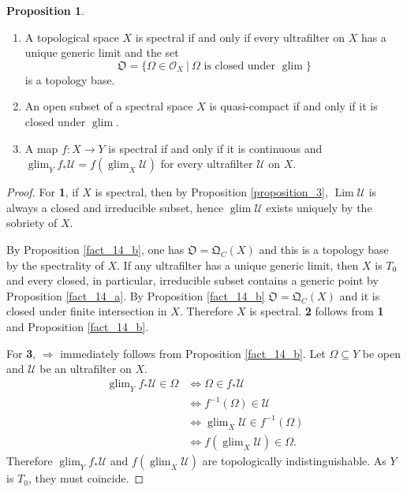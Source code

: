 \documentclass[10pt]{article}
\numberwithin{equation}{section}
\theoremstyle{definition}
\newtheorem{proposition}{Proposition}[subsection]
\DeclareMathOperator{\Lim}{Lim}
\DeclareMathOperator{\glim}{glim}
\newcommand{\Ouv}{\mathscr{O}}
\newcommand{\U}[0]{\mathcal{U}}
\newcommand{\sep}[0]{\:|\:}
\newcommand{\QC}[0]{\mathfrak{Q}_C}
\begin{document}
\begin{proposition}$\:$
    \label{proposition_4}
    \begin{enumerate}[1.]
        \item A topological space $X$ is spectral if and only if every ultrafilter on $X$ has a unique generic limit and the set
        \begin{equation*}
            \mathfrak{O}=\{\Omega\in\Ouv_X\sep \text{$\Omega$ is closed under $\glim$}\}
        \end{equation*}
        is a topology base.
        \item An open subset of a spectral space $X$ is quasi-compact if and only if it is closed under $\glim$.
        \item A map $f:X\to Y$ is spectral if and only if it is continuous and $\glim_Y f_*\U = f(\glim_X\U)$ for every ultrafilter $\U$ on $X$.%
    \end{enumerate}
\end{proposition}

\begin{proof}
    For \textbf{1}, if $X$ is spectral, then by Proposition \ref{proposition_3}, $\Lim\U$ is always a closed and irreducible subset, hence $\glim\U$ exists uniquely by the sobriety of $X$.
    \par By Proposition \ref{fact_14_b}, one has $\mathfrak{O}=\QC(X)$ and this is a topology base by the spectrality of $X$. If any ultrafilter has a unique generic limit, then $X$ is $T_0$ and every closed, in particular, irreducible subset contains a generic point by Proposition \ref{fact_14_a}. By Proposition \ref{fact_14_b} $\mathfrak{O}=\QC(X)$ and it is closed under finite intersection
    in $X$. Therefore $X$ is spectral. \textbf{2} follows from \textbf{1} and Proposition \ref{fact_14_b}.
    \par For \textbf{3}, $\Rightarrow$ immediately follows from Proposition \ref{fact_14_b}. Let $\Omega\subseteq Y$ be open and $\U$ be an ultrafilter on $X$.
    \begin{align*}
        \glim_Yf_*\U\in\Omega&\Leftrightarrow \Omega\in f_*\U\\
        &\Leftrightarrow f^{-1}(\Omega)\in\U\\
        &\Leftrightarrow \glim_X\U\in f^{-1}(\Omega)\\
        &\Leftrightarrow f(\glim_X\U)\in\Omega.
    \end{align*}
    Therefore $\glim_Yf_*\U$ and $f(\glim_X\U)$ are topologically indistinguishable. As $Y$ is $T_0$, they must coincide.
\end{proof}
\end{document}
